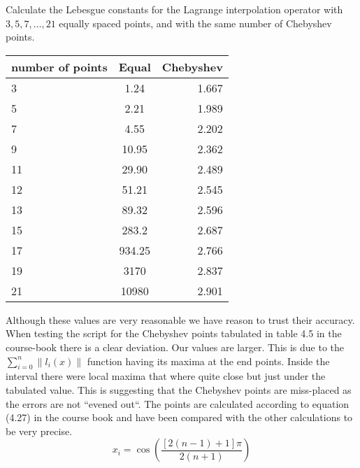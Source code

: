 \begin{problem}
  Calculate the Lebesgue constants for the Lagrange interpolation
  operator with $3, 5, 7, \dots , 21$ equally spaced points, and with the
  same number of Chebyshev points.
\end{problem}


\begin{solution}
  \begin{table}[!ht]
    \begin{center}
      \begin{tabular}{ l  c  r }
        number of points & Equal & Chebyshev \\ \hline
        3 & 1.24 & 1.667 \\
        5 & 2.21 & 1.989 \\
        7 & 4.55 & 2.202 \\
        9 & 10.95 & 2.362 \\
        11 & 29.90 & 2.489 \\
        12 & 51.21 & 2.545 \\
        13 & 89.32 & 2.596 \\
        15 & 283.2 & 2.687 \\
        17 & 934.25 & 2.766 \\
        19 & 3170 & 2.837 \\
        21 & 10980 & 2.901 \\
      \end{tabular}
    \end{center}
  \end{table}

  Although these values are very reasonable we have reason to trust
  their accuracy. When testing the script for the Chebyshev points tabulated in
  table 4.5 in the course-book there is a clear deviation. Our values are larger. This is
  due to the $\sum_{i=0}^n \|l_i(x)\|$ function having its maxima at the
  end points. Inside the interval there were local maxima that where
  quite close but just under the tabulated value. This is suggesting
  that the Chebyshev points are miss-placed as the errors are not
  ``evened out``. The points are calculated according to equation
  (4.27) in the course book and have been compared with the other
  calculations to be very precise. 
  \begin{equation*}
    x_i = \cos\left(\frac{[2(n - 1) +1]\pi}{2(n + 1)}\right)
  \end{equation*}
\end{solution}

